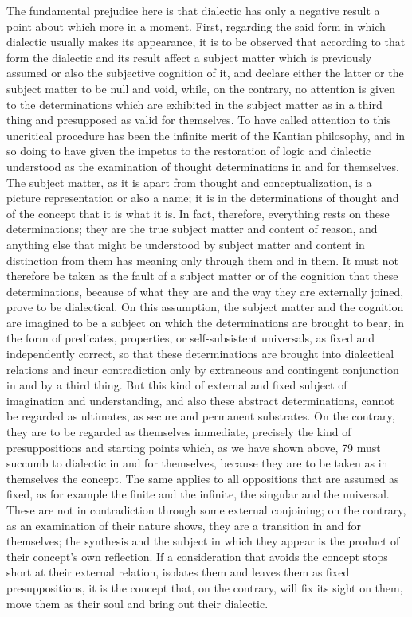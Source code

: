 The fundamental prejudice here is that dialectic has only a negative
result
 a point about which more in a moment. First, regarding the said
form in which dialectic usually makes its appearance, it is to be observed
that according to that form the dialectic and its result affect a subject matter
which is previously assumed or also the subjective cognition of it, and
declare either the latter or the subject matter to be null and void, while,
on the contrary, no attention is given to the determinations which are
exhibited in the subject matter as in a third thing and presupposed as valid
for themselves. To have called attention to this uncritical procedure has
been the infinite merit of the Kantian philosophy, and in so doing to have
given the impetus to the restoration of logic and dialectic understood as the
examination of thought determinations in and for themselves. The subject
matter, as it is apart from thought and conceptualization, is a picture
representation or also a name; it is in the determinations of thought and of
the concept that it is what it is. In fact, therefore, everything rests on these
determinations; they are the true subject matter and content of reason,
and anything else that might be understood by subject matter and content
in distinction from them has meaning only through them and in them.
It must not therefore be taken as the fault of a subject matter or of the
cognition that these determinations, because of what they are and the way
they are externally joined, prove to be dialectical. On this assumption,
the subject matter and the cognition are imagined to be a subject on
which the determinations are brought to bear, in the form of predicates,
properties, or self-subsistent universals, as fixed and independently correct,
so that these determinations are brought into dialectical relations and incur
contradiction only by extraneous and contingent conjunction in and by a
third thing. But this kind of external and fixed subject of imagination and
understanding, and also these abstract determinations, cannot be regarded
as ultimates, as secure and permanent substrates. On the contrary, they are to
be regarded as themselves immediate, precisely the kind of presuppositions
and starting points which, as we have shown above, 79 must succumb to
dialectic in and for themselves, because they are to be taken as in themselves
the concept. The same applies to all oppositions that are assumed as fixed,
as for example the finite and the infinite, the singular and the universal.
These are not in contradiction through some external conjoining; on the
contrary, as an examination of their nature shows, they are a transition in
and for themselves; the synthesis and the subject in which they appear is
the product of their concept's own reflection. If a consideration that avoids
the concept stops short at their external relation, isolates them and leaves
them as fixed presuppositions, it is the concept that, on the contrary, will
fix its sight on them, move them as their soul and bring out their dialectic.


